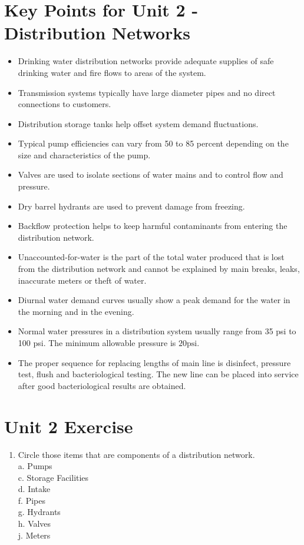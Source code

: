 \documentclass[10pt]{article}
\begin{document}
\section{Key Points for Unit 2 - Distribution Networks}
\begin{itemize}
  \item Drinking water distribution networks provide adequate supplies of safe drinking water and fire flows to areas of the system.

  \item Transmission systems typically have large diameter pipes and no direct connections to customers.

  \item Distribution storage tanks help offset system demand fluctuations.

  \item Typical pump efficiencies can vary from 50 to 85 percent depending on the size and characteristics of the pump.

  \item Valves are used to isolate sections of water mains and to control flow and pressure.

  \item Dry barrel hydrants are used to prevent damage from freezing.

  \item Backflow protection helps to keep harmful contaminants from entering the distribution network.

  \item Unaccounted-for-water is the part of the total water produced that is lost from the distribution network and cannot be explained by main breaks, leaks, inaccurate meters or theft of water.

  \item Diurnal water demand curves usually show a peak demand for the water in the morning and in the evening.

  \item Normal water pressures in a distribution system usually range from 35 psi to 100 psi. The minimum allowable pressure is $20 \mathrm{psi}$.

  \item The proper sequence for replacing lengths of main line is disinfect, pressure test, flush and bacteriological testing. The new line can be placed into service after good bacteriological results are obtained.

\end{itemize}
\section{Unit 2 Exercise}
\begin{enumerate}
  \item Circle those items that are components of a distribution network.\\
a. Pumps\\
c. Storage Facilities\\
d. Intake\\
f. Pipes\\
g. Hydrants\\
h. Valves\\
j. Meters
\end{enumerate}
\end{document}
